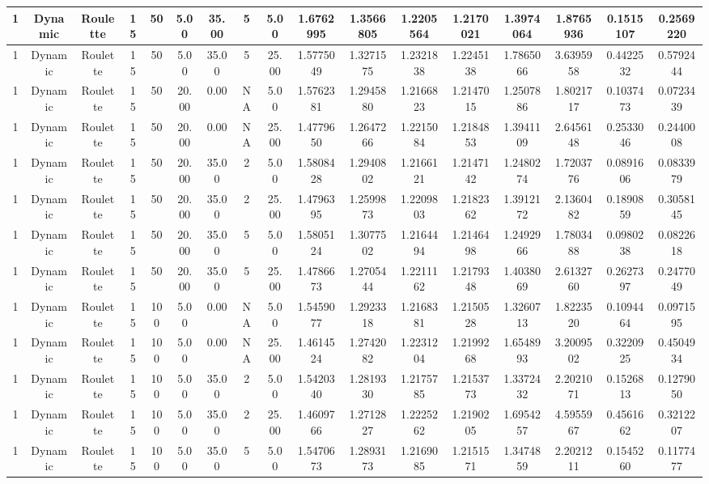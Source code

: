 \begin{longtable}{ | c | c | c | c | c | c | c | c | c | c | c | c | c | c | c | c | c | }
	\hline
	1	&	Dynamic	&	Roulette	&	15	&	50	&	5.00	&	35.00	&	5	&	5.00	&	1.6762995	&	1.3566805	&	1.2205564	&	1.2170021	&	1.3974064	&	1.8765936	&	0.1515107	&	0.2569220 \\
	\hline
	1	&	Dynamic	&	Roulette	&	15	&	50	&	5.00	&	35.00	&	5	&	25.00	&	1.5775049	&	1.3271575	&	1.2321838	&	1.2245138	&	1.7865066	&	3.6395958	&	0.4422532	&	0.5792444 \\
	\hline
	1	&	Dynamic	&	Roulette	&	15	&	50	&	20.00	&	0.00	&	NA	&	5.00	&	1.5762381	&	1.2945880	&	1.2166823	&	1.2147015	&	1.2507886	&	1.8021717	&	0.1037473	&	0.0723439 \\
	\hline
	1	&	Dynamic	&	Roulette	&	15	&	50	&	20.00	&	0.00	&	NA	&	25.00	&	1.4779650	&	1.2647266	&	1.2215084	&	1.2184853	&	1.3941109	&	2.6456148	&	0.2533046	&	0.2440008 \\
	\hline
	1	&	Dynamic	&	Roulette	&	15	&	50	&	20.00	&	35.00	&	2	&	5.00	&	1.5808428	&	1.2940802	&	1.2166121	&	1.2147142	&	1.2480274	&	1.7203776	&	0.0891606	&	0.0833979 \\
	\hline
	1	&	Dynamic	&	Roulette	&	15	&	50	&	20.00	&	35.00	&	2	&	25.00	&	1.4796395	&	1.2599873	&	1.2209803	&	1.2182362	&	1.3912172	&	2.1360482	&	0.1890859	&	0.3058145 \\
	\hline
	1	&	Dynamic	&	Roulette	&	15	&	50	&	20.00	&	35.00	&	5	&	5.00	&	1.5805124	&	1.3077502	&	1.2164494	&	1.2146498	&	1.2492966	&	1.7803488	&	0.0980238	&	0.0822618 \\
	\hline
	1	&	Dynamic	&	Roulette	&	15	&	50	&	20.00	&	35.00	&	5	&	25.00	&	1.4786673	&	1.2705444	&	1.2211162	&	1.2179348	&	1.4038069	&	2.6132760	&	0.2627397	&	0.2477049 \\
	\hline
	1	&	Dynamic	&	Roulette	&	15	&	100	&	5.00	&	0.00	&	NA	&	5.00	&	1.5459077	&	1.2923318	&	1.2168381	&	1.2150528	&	1.3260713	&	1.8223520	&	0.1094464	&	0.0971595 \\
	\hline
	1	&	Dynamic	&	Roulette	&	15	&	100	&	5.00	&	0.00	&	NA	&	25.00	&	1.4614524	&	1.2742082	&	1.2231204	&	1.2199268	&	1.6548993	&	3.2009502	&	0.3220925	&	0.4504934 \\
	\hline
	1	&	Dynamic	&	Roulette	&	15	&	100	&	5.00	&	35.00	&	2	&	5.00	&	1.5420340	&	1.2819330	&	1.2175785	&	1.2153773	&	1.3372432	&	2.2021071	&	0.1526813	&	0.1279050 \\
	\hline
	1	&	Dynamic	&	Roulette	&	15	&	100	&	5.00	&	35.00	&	2	&	25.00	&	1.4609766	&	1.2712827	&	1.2225262	&	1.2190205	&	1.6954257	&	4.5955967	&	0.4561662	&	0.3212207 \\
	\hline
	1	&	Dynamic	&	Roulette	&	15	&	100	&	5.00	&	35.00	&	5	&	5.00	&	1.5470673	&	1.2893173	&	1.2169085	&	1.2151571	&	1.3474859	&	2.2021211	&	0.1545260	&	0.1177477 \\

\end{longtable}
